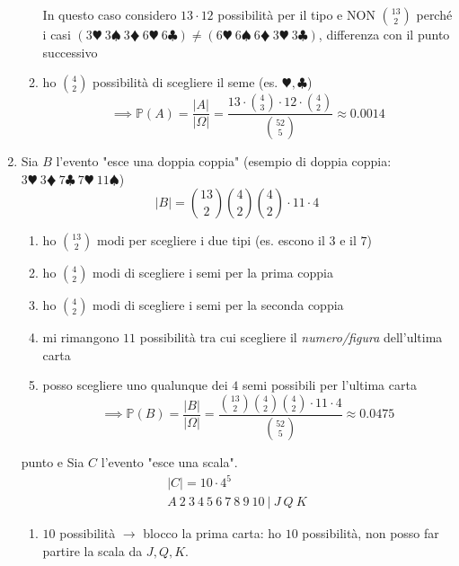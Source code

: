 \begin{enumerate}
\begin{enumerate}
\begin{oss}
In questo caso considero $13\cdot 12$ possibilità per il tipo e NON $\binom{13}{2}$ perché i casi $( 3\varheartsuit \ 3\spadesuit \ 3\vardiamondsuit \ 6\varheartsuit \ 6\clubsuit ) \neq ( 6\varheartsuit \ 6\spadesuit \ 6\vardiamondsuit \ 3\varheartsuit \ 3\clubsuit )$, differenza con il punto successivo
\end{oss}
\item ho $\binom{4}{2}$ possibilità di scegliere il seme (es. $\varheartsuit ,\clubsuit $)\begin{equation*}
\mathbb{\implies P}( A) =\frac{| A| }{| \Omega | } =\frac{13\cdot \binom{4}{3} \cdot 12\cdot \binom{4}{2}}{\binom{52}{5}} \approx 0.0014
\end{equation*}
\end{enumerate}
\item Sia $B$ l'evento "esce una doppia coppia" (esempio di doppia coppia: $3\varheartsuit \ 3\vardiamondsuit \ 7\clubsuit \ 7\varheartsuit \ 11\spadesuit $)\begin{equation*}
| B| =\binom{13}{2}\binom{4}{2}\binom{4}{2} \cdot 11\cdot 4
\end{equation*}
\begin{enumerate}
\item ho $\binom{13}{2}$ modi per scegliere i due tipi (es. escono il $3$ e il $7$)
\item ho $\binom{4}{2}$ modi di scegliere i semi per la prima coppia
\item ho $\binom{4}{2}$ modi di scegliere i semi per la seconda coppia
\item mi rimangono $11$ possibilità tra cui scegliere il \textit{numero/figura} dell'ultima carta
\item posso scegliere uno qualunque dei $4$ semi possibili per l'ultima carta\begin{equation*}
\mathbb{\implies P}( B) =\frac{| B| }{| \Omega | } =\frac{\binom{13}{2}\binom{4}{2}\binom{4}{2} \cdot 11\cdot 4}{\binom{52}{5}} \approx 0.0475
\end{equation*}
\end{enumerate}
\item [punto e] Sia $C$ l'evento "esce una scala".\begin{gather*}
| C| =10\cdot 4^{5}\\
A\ 2\ 3\ 4\ 5\ 6\ 7\ 8\ 9\ 10\ |\ J\ Q\ K
\end{gather*}
\begin{enumerate}
\item $10$ possibilità $\rightarrow $ blocco la prima carta: ho $10$ possibilità, non posso far partire la scala da $J,Q,K$.

\end{enumerate}
\end{enumerate}
